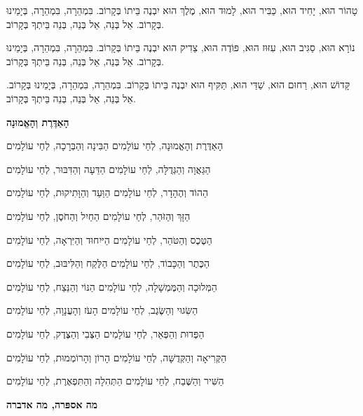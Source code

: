 \vspace{1em}

טָהוֹר הוּא, יָחִיד הוּא, כַּבִּיר הוּא, לָמוּד הוּא, מֶלֶךְ הוּא יִבְנֶה בֵּיתוֹ בְּקָרוֹב. בִּמְהֵרָה, בִּמְהֵרָה, בְּיָמֵינוּ בְּקָרוֹב. אֵל בְּנֵה, אֵל בְּנֵה, בְּנֵה בֵּיתְךָ בְּקָרוֹב.

\vspace{1em}

נוֹרָא הוּא, סַגִּיב הוּא, עִזּוּז הוּא, פּוֹדֶה הוּא, צַדִיק הוּא יִבְנֶה בֵּיתוֹ בְּקָרוֹב. בִּמְהֵרָה, בִּמְהֵרָה, בְּיָמֵינוּ בְּקָרוֹב. אֵל בְּנֵה, אֵל בְּנֵה, בְּנֵה בֵּיתְךָ בְּקָרוֹב.

\vspace{1em}

קָּדוֹשׁ הוּא, רַחוּם הוּא, שַׁדַּי הוּא, תַּקִּיף הוּא יִבְנֶה בֵּיתוֹ בְּקָרוֹב. בִּמְהֵרָה, בִּמְהֵרָה, בְּיָמֵינוּ בְּקָרוֹב. אֵל בְּנֵה, אֵל בְּנֵה, בְּנֵה בֵּיתְךָ בְּקָרוֹב.


\begin{center}
{\large \bfseries
הָאַדֶּרֶת וְהָאֱמוּנָה
}
\end{center}

הָאַדֶּרֶת וְהָאֱמוּנָה, לְחַי עוֹלָמִים
\hfill
הַבִּינָה וְהַבְּרָכָה, לְחַי עוֹלָמִים

הַגַּאֲוָה וְהַגְּדֻלָּה, לְחַי עוֹלָמִים
\hfill
הַדֵּעָה וְהַדִּבּוּר, לְחַי עוֹלָמִים

הַהוֹד וְהֶהָדָר, לְחַי עוֹלָמִים
\hfill
הַוַּעַד וְהַוָּתִיקוּת, לְחַי עוֹלָמִים

הַזָּךְ וְהַזֹּהַר, לְחַי עוֹלָמִים
\hfill
הַחַיִל וְהַחֹסֶן, לְחַי עוֹלָמִים

הַטֶּכֶס וְהַטֹּהַר, לְחַי עוֹלָמִים
\hfill
הַיּיִחוּד וְהַיִּרְאָה, לְחַי עוֹלָמִים

הַכֶּתֶר וְהַכָּבוֹד, לְחַי עוֹלָמִים
\hfill
הַלֶּקַח וְהַלִּיבּוּב, לְחַי עוֹלָמִים

הַמְּלוּכָה וְהַמֶּמְשָׁלָה, לְחַי עוֹלָמִים
\hfill
הַנּוֹי וְהַנֵּצַח, לְחַי עוֹלָמִים

הַשִּׂגוּי וְהַשֶּׂגֶב, לְחַי עוֹלָמִים
\hfill
הָעֹז וְהָעֲנָוָה, לְחַי עוֹלָמִים

הַפְּדוּת וְהַפְּאֵר, לְחַי עוֹלָמִים
\hfill
הַצְּבִי וְהַצֶּדֶק, לְחַי עוֹלָמִים

הַקְּרִיאָה וְהַקְּדֻשָּׁה, לְחַי עוֹלָמִים
\hfill
הָרוֹן וְהָרוֹמְמוּת, לְחַי עוֹלָמִים

הַשִּׁיר וְהַשֶּׁבַח, לְחַי עוֹלָמִים
\hfill
הַתְּהִלָה וְהַתִּפְאֶרֶת, לְחַי עוֹלָמִים

\break
\begin{center}
{\large \bfseries
מה אספּרה, מה אדברה
}
\end{center}

